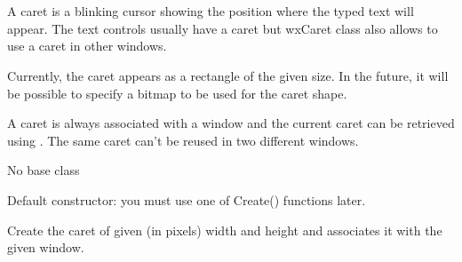 
\section{}\label{wxcaret}

A caret is a blinking cursor showing the position where the typed text will
appear. The text controls usually have a caret but wxCaret class also allows
to use a caret in other windows.

Currently, the caret appears as a rectangle of the given size. In the future,
it will be possible to specify a bitmap to be used for the caret shape.

A caret is always associated with a window and the current caret can be
retrieved using . The same caret
can't be reused in two different windows.


No base class



\label{wxcaretwxcaret}


Default constructor: you must use one of Create() functions later.



Create the caret of given (in pixels) width and height and associates it
with the given window.

\label{wxcaretcreate}



